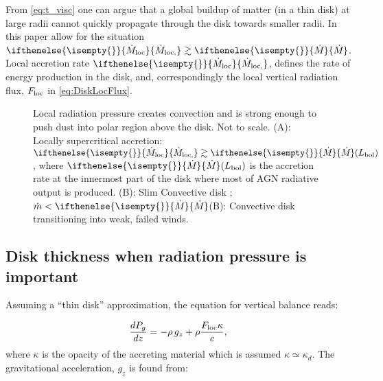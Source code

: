 \documentclass[12pt,english,preprint]{aastex}
\newcommand{\su}[2]{#1_{\rm #2}}
\newcommand{\mdt}[1][]{ 
  \ifthenelse{\isempty{#1}}
  {\dot{M}_{\rm loc}}
  { {\dot M}_{\rm{loc},{#1}} } 
  } %
\newcommand{\Mdt}[1][]{ 
    \ifthenelse{\isempty{#1}}
    {\dot{M}_{}}
    { {\dot M}_{{#1}} } 
} %
\begin{document}
From \eqref{eq:t_visc} one can argue that a global buildup of matter (in a thin disk) at large radii 
cannot quickly propagate through the disk towards smaller radii. 
In this paper allow for the situation $\mdt\gtrsim\Mdt$. 
Local accretion rate $\mdt$, defines the rate of energy production in the disk, and, 
correspondingly the local vertical radiation flux, $\su{F}{loc}$ in \eqref{eq:DiskLocFlux}.






\begin{figure}
\caption{\label{fig:DiskSketch} 
Local radiation pressure creates convection
and is strong enough to push dust into polar region above the disk. Not to scale.
(A): Locally supercritical accretion: $\mdt\gtrsim \Mdt  (L_{{\rm bol}})$, where
$\Mdt(L_{{\rm bol}})$ is the accretion rate at the innermost part
of the disk where most of AGN radiative output is produced. (B): Slim Convective
disk ; $\dot{m}<\Mdt$(B):
Convective disk transitioning into weak, failed winds.}
\end{figure}

\subsection{Disk thickness when radiation pressure is important}
Assuming a ``thin disk''
approximation, the equation for vertical balance reads:

\begin{equation}
\frac{dP_g}{dz}=-\rho\,g_{z} + \rho\frac{\su{F}{loc}\kappa}{c}\mbox{,}\label{eq:dPdz}
\end{equation}
where $\kappa$ is the opacity of the accreting material which
is assumed $\kappa\simeq\kappa_d$. The gravitational 
acceleration, $g_{z}$ is found from:
\end{document}
